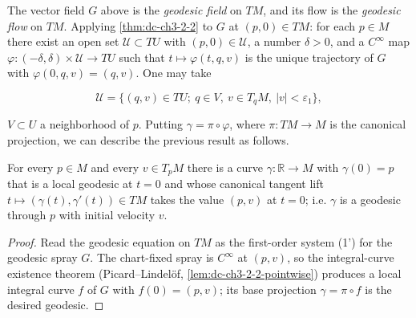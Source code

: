\begin{definition}
  \label{def:dc-ch3-2-4}
  \leanok
  The vector field $G$ above is the \emph{geodesic field} on $TM$, and its flow is the
  \emph{geodesic flow} on $TM$. Applying \cref{thm:dc-ch3-2-2} to $G$ at $(p,0)\in TM$: for each
  $p\in M$ there exist an open set $\mathcal{U}\subset TU$ with $(p,0)\in\mathcal{U}$,
  a number $\delta>0$, and a $C^\infty$ map $\varphi:(-\delta,\delta)\times\mathcal{U}\to TU$
  such that $t\mapsto\varphi(t,q,v)$ is the unique trajectory of $G$ with
  $\varphi(0,q,v)=(q,v)$. One may take
  
  $$
  \mathcal{U}=\{(q,v)\in TU;\ q\in V,\ v\in T_qM,\ |v|<\varepsilon_1\},
  $$
  
  $V\subset U$ a neighborhood of $p$. Putting $\gamma=\pi\circ\varphi$, where
  $\pi:TM\to M$ is the canonical projection, we can describe the previous result as
  follows.
\end{definition}

\begin{lemma}
  \label{lem:dc-ch3-2-5-exist}
  \leanok
  For every $p\in M$ and every $v\in T_pM$ there is a curve $\gamma:\mathbb{R}\to M$
  with $\gamma(0)=p$ that is a local geodesic at $t=0$ and whose canonical tangent
  lift $t\mapsto(\gamma(t),\gamma'(t))\in TM$ takes the value $(p,v)$ at $t=0$; i.e.
  $\gamma$ is a geodesic through $p$ with initial velocity $v$.
\end{lemma}
\begin{proof}
  \sketch
  \leanok
  Read the geodesic equation on $TM$ as the first-order system (1') for the
  geodesic spray $G$. The chart-fixed spray is $C^\infty$ at $(p,v)$, so the
  integral-curve existence theorem (Picard--Lindel\"of,
  \cref{lem:dc-ch3-2-2-pointwise}) produces a local integral curve $f$ of $G$ with
  $f(0)=(p,v)$; its base projection $\gamma=\pi\circ f$ is the desired geodesic.
\end{proof}

